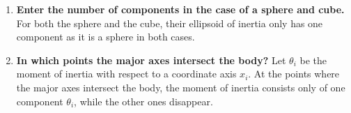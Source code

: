 \begin{enumerate}
\begin{enumerate}
		\item
		\textbf{Enter the number of components in the case of a sphere and cube.}
		For both the sphere and the cube, their ellipsoid of inertia only has one component as it is a sphere in both cases.
	
		\item
		\textbf{In which points the major axes intersect the body?}
		Let $\theta_i$ be the moment of inertia with respect to a coordinate axis $x_i$. 
		At the points where the major axes intersect the body, the moment of inertia consists only of one component $\theta_i$, while the other ones disappear.
		
		
	\end{enumerate}
	
\end{enumerate}